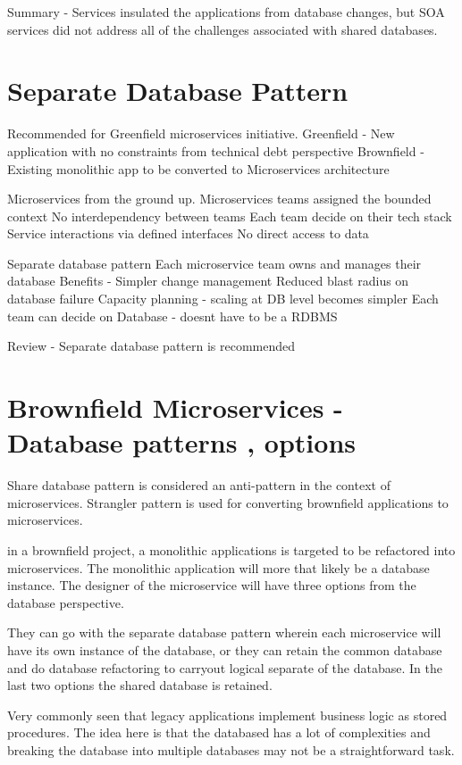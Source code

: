 Summary
- Services insulated the applications from database changes, but SOA services did not address all of the challenges associated with shared databases.

\section{Separate Database Pattern}
Recommended for Greenfield microservices initiative.
Greenfield - New application with no constraints from technical debt perspective
Brownfield - Existing monolithic app to be converted to Microservices architecture

Microservices from the ground up.
Microservices teams assigned the bounded context
No interdependency between teams
Each team decide on their tech stack
Service interactions via defined interfaces
No direct access to data

Separate database pattern
Each microservice team owns and manages their database
Benefits - Simpler change management
Reduced blast radius on database failure
Capacity planning - scaling at DB level becomes simpler
Each team can decide on Database - doesnt have to be a RDBMS

Review
- Separate database pattern is recommended

\section{Brownfield Microservices - Database patterns , options}
Share database pattern is considered an anti-pattern in the context of microservices.
Strangler pattern is used for converting brownfield applications to microservices.

in a brownfield project, a monolithic applications is targeted to be refactored into microservices.
The monolithic application will more that likely be a database instance.
The designer of the microservice will have three options from the database perspective.

They can go with the separate database pattern wherein each microservice will have its own instance of the database, or they can retain the common database and do database refactoring to carryout logical separate of the database.
In the last two options the shared database is retained.

Very commonly seen that legacy applications implement business logic as stored procedures.
The idea here is that the databased has a lot of complexities and breaking the database into multiple databases may not be a straightforward task.

